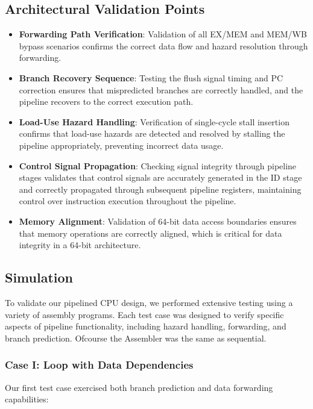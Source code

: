 \documentclass{article}
\numberwithin{figure}{section}
\numberwithin{table}{section}
\begin{document}
\subsection{Architectural Validation Points}
\begin{itemize}
\item \textbf{Forwarding Path Verification}: Validation of all EX/MEM and MEM/WB bypass scenarios confirms the correct data flow and hazard resolution through forwarding.
\item \textbf{Branch Recovery Sequence}: Testing the flush signal timing and PC correction ensures that mispredicted branches are correctly handled, and the pipeline recovers to the correct execution path.
\item \textbf{Load-Use Hazard Handling}: Verification of single-cycle stall insertion confirms that load-use hazards are detected and resolved by stalling the pipeline appropriately, preventing incorrect data usage.
\item \textbf{Control Signal Propagation}: Checking signal integrity through pipeline stages validates that control signals are accurately generated in the ID stage and correctly propagated through subsequent pipeline registers, maintaining control over instruction execution throughout the pipeline.
\item \textbf{Memory Alignment}: Validation of 64-bit data access boundaries ensures that memory operations are correctly aligned, which is critical for data integrity in a 64-bit architecture.
\end{itemize}


\subsection{Simulation}

To validate our pipelined CPU design, we performed extensive testing using a variety of assembly programs. Each test case was designed to verify specific aspects of pipeline functionality, including hazard handling, forwarding, and branch prediction. Ofcourse the Assembler was the same as sequential.

\subsubsection{Case I: Loop with Data Dependencies}

Our first test case exercised both branch prediction and data forwarding capabilities:
\end{document}
